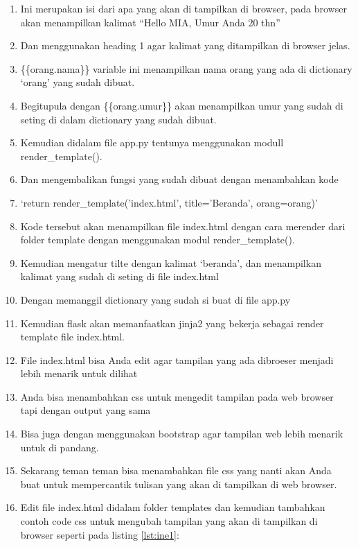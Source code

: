 \begin{enumerate}
\item Ini merupakan isi dari apa yang akan di tampilkan di browser, pada browser akan menampilkan kalimat “Hello MIA, Umur Anda 20 thn”
\item Dan menggunakan heading 1 agar kalimat yang ditampilkan di browser jelas.
\item \{\{orang.nama\}\} variable ini menampilkan nama orang yang ada di dictionary ‘orang’ yang sudah dibuat.
\item Begitupula dengan \{\{orang.umur\}\} akan  menampilkan umur yang sudah di seting di dalam dictionary yang sudah dibuat.
\item Kemudian didalam file app.py tentunya menggunakan modull render\_template().
\item Dan mengembalikan fungsi yang sudah dibuat dengan menambahkan kode 
\item ‘return render\_template('index.html', title='Beranda', orang=orang)’
\item Kode tersebut akan menampilkan file index.html dengan cara merender dari folder template dengan menggunakan modul render\_template().
 \item Kemudian mengatur tilte dengan kalimat ‘beranda’, dan menampilkan kalimat yang sudah di seting di file index.html
 \item Dengan memanggil dictionary yang sudah si buat di file app.py
\item Kemudian flask akan memanfaatkan jinja2 yang bekerja sebagai render template file index.html.
\item File index.html bisa  Anda edit agar tampilan yang ada dibroeser menjadi lebih menarik untuk dilihat
\item Anda bisa menambahkan css untuk mengedit tampilan pada web browser tapi dengan output yang sama 
\item Bisa juga dengan menggunakan bootstrap agar tampilan web lebih menarik untuk di pandang.
\item Sekarang teman teman bisa menambahkan file css yang nanti akan  Anda buat untuk mempercantik tulisan yang akan di tampilkan di web browser.
\item Edit file index.html didalam folder templates dan kemudian tambahkan contoh code css untuk mengubah tampilan yang akan di tampilkan di browser seperti pada listing \ref{lst:ine1}:



\end{enumerate}
